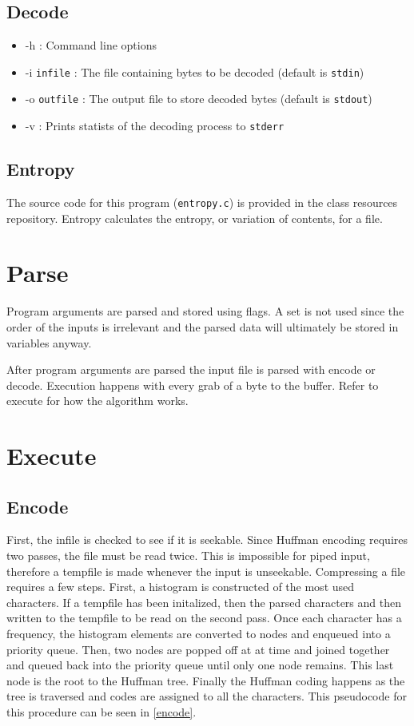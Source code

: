 \documentclass[12pt]{article}
\def\code#1{\texttt{#1}} %
\begin{document}
\subsection{Decode}

\begin{itemize}
	\item{-h : Command line options }
	\item{-i \code{infile} : The file containing bytes to be decoded (default is \code{stdin})}
	\item{-o \code{outfile} : The output file to store decoded bytes (default is \code{stdout})}
	\item{-v : Prints statists of the decoding process to \code{stderr}}
\end{itemize}

\subsection{Entropy}

The source code for this program (\code{entropy.c}) is provided in the class resources repository.
Entropy calculates the entropy, or variation of contents, for a file.

\section{Parse}

Program arguments are parsed and stored using flags.
A set is not used since the order of the inputs is irrelevant and the parsed data
will ultimately be stored in variables anyway.

After program arguments are parsed the input file is parsed with encode or decode.
Execution happens with every grab of a byte to the buffer.
Refer to execute for how the algorithm works.

\section{Execute}

\subsection{Encode}

First, the infile is checked to see if it is seekable. Since Huffman encoding
requires two passes, the file must be read twice. This is impossible for piped input,
therefore a tempfile is made whenever the input is unseekable. Compressing a file 
requires a few steps. First, a histogram is constructed of the
most used characters. If a tempfile has been initalized, then the parsed characters
and then written to the tempfile to be read on the second pass. Once each character
has a frequency, the histogram elements
are converted to nodes and enqueued into a priority queue. Then, two nodes are 
popped off at at time and joined together and queued back into the priority
queue until only one node remains. This last node is the root to the Huffman
tree. Finally the Huffman coding happens as the tree is traversed and codes
are assigned to all the characters. This pseudocode for this procedure
can be seen in \vref{encode}.
\end{document}

